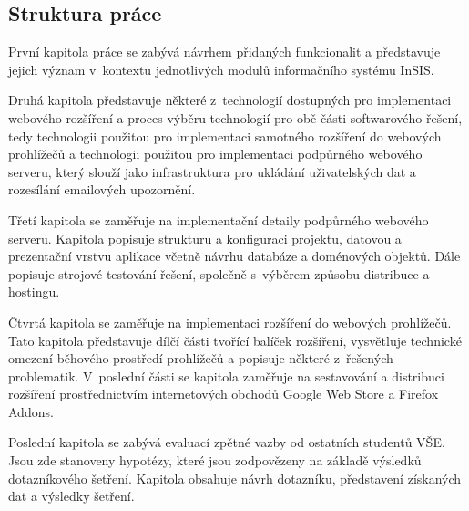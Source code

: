 \subsection*{Struktura práce}

První kapitola práce se zabývá návrhem přidaných funkcionalit a představuje jejich význam v~kontextu jednotlivých modulů informačního systému InSIS.

Druhá kapitola představuje některé z~technologií dostupných pro implementaci webového rozšíření a proces výběru technologií pro obě části softwarového řešení, tedy technologii použitou pro implementaci samotného rozšíření do webových prohlížečů a technologii použitou pro implementaci podpůrného webového serveru, který slouží jako infrastruktura pro ukládání uživatelských dat a rozesílání emailových upozornění.

Třetí kapitola se zaměřuje na implementační detaily podpůrného webového serveru. Kapitola popisuje strukturu a konfiguraci projektu, datovou a prezentační vrstvu aplikace včetně návrhu databáze a doménových objektů. Dále popisuje strojové testování řešení, společně s~výběrem způsobu distribuce a hostingu.  

Čtvrtá kapitola se zaměřuje na implementaci rozšíření do webových prohlížečů. Tato kapitola představuje dílčí části tvořící balíček rozšíření, vysvětluje technické omezení běhového prostředí prohlížečů a popisuje některé z~řešených problematik. V~poslední části se kapitola zaměřuje na sestavování a distribuci rozšíření prostřednictvím internetových obchodů Google Web Store a Firefox Addons.

Poslední kapitola se zabývá evaluací zpětné vazby od ostatních studentů VŠE. Jsou zde stanoveny hypotézy, které jsou zodpovězeny na základě výsledků dotazníkového šetření. Kapitola obsahuje návrh dotazníku, představení získaných dat a výsledky šetření. 



